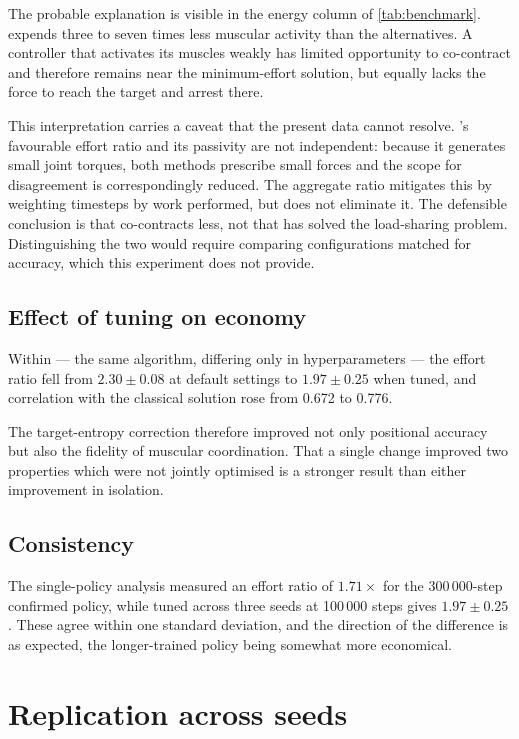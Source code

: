 The probable explanation is visible in the energy column of
\cref{tab:benchmark}. \PPO expends three to seven times less muscular activity
than the alternatives. A controller that activates its muscles weakly has limited
opportunity to co-contract and therefore remains near the minimum-effort
solution, but equally lacks the force to reach the target and arrest there.

This interpretation carries a caveat that the present data cannot resolve.
\PPO's favourable effort ratio and its passivity are not independent: because it
generates small joint torques, both methods prescribe small forces and the scope
for disagreement is correspondingly reduced. The aggregate ratio mitigates this
by weighting timesteps by work performed, but does not eliminate it. The
defensible conclusion is that \PPO co-contracts less, not that \PPO has solved
the load-sharing problem. Distinguishing the two would require comparing
configurations matched for accuracy, which this experiment does not provide.

\subsection{Effect of tuning on economy}

Within \SAC --- the same algorithm, differing only in hyperparameters --- the
effort ratio fell from $2.30 \pm 0.08$ at default settings to $1.97 \pm 0.25$
when tuned, and correlation with the classical solution rose from 0.672 to 0.776.

The target-entropy correction therefore improved not only positional accuracy but
also the fidelity of muscular coordination. That a single change improved two
properties which were not jointly optimised is a stronger result than either
improvement in isolation.

\subsection{Consistency}

The single-policy analysis measured an effort ratio of $1.71\times$ for the
300\,000-step confirmed policy, while tuned \SAC across three seeds at
100\,000 steps gives $1.97 \pm 0.25$. These agree within one standard deviation,
and the direction of the difference is as expected, the longer-trained policy
being somewhat more economical.

\section{Replication across seeds}
\label{sec:replication}

